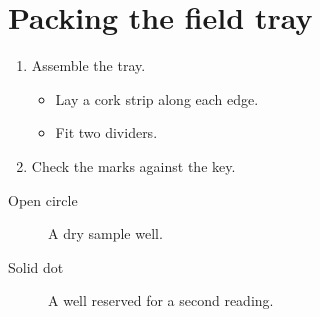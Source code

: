 \documentclass{article}
\begin{document}
\section*{Packing the field tray}

\begin{enumerate}\item Assemble the tray.
\begin{itemize}\item Lay a cork strip along each edge.\item Fit two dividers.\end{itemize}
\item Check the marks against the key.\end{enumerate}
\begin{description}\item[Open circle]A dry sample well.\item[Solid dot]A well reserved for a second reading.\end{description}
\end{document}
